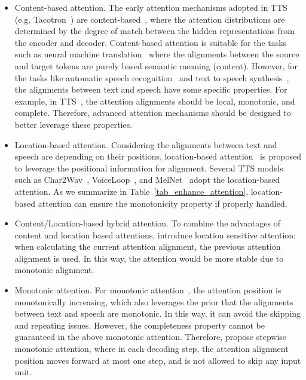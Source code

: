 \documentclass{article}
\begin{document}
\begin{itemize}[leftmargin=*]
    \item Content-based attention. The early attention mechanisms adopted in TTS (e.g. Tacotron~\cite{wang2017tacotron}) are content-based~\cite{bahdanau2014neural}, where the attention distributions are determined by the degree of match between the hidden representations from the encoder and decoder. Content-based attention is suitable for the tasks such as neural machine translation~\cite{bahdanau2014neural,vaswani2017attention} where the alignments between the source and target tokens are purely based semantic meaning (content). However, for the tasks like automatic speech recognition~\cite{chorowski2015attention,chan2016listen,chiu2018state} and text to speech synthesis~\cite{wang2017tacotron}, the alignments between text and speech have some specific properties. For example, in TTS~\cite{he2019robust}, the attention alignments should be local, monotonic, and complete. Therefore, advanced attention mechanisms should be designed to better leverage these properties.  
    \item Location-based attention. Considering the alignments between text and speech are depending on their positions, location-based attention~\cite{graves2013generating,battenberg2020location} is proposed to leverage the positional information for alignment. Several TTS models such as Char2Wav~\cite{sotelo2017char2wav}, VoiceLoop~\cite{taigman2018voiceloop}, and MelNet~\cite{vasquez2019melnet} adopt the location-based attention. As we summarize in Table~\ref{tab_enhance_attention}, location-based attention can ensure the monotonicity property if properly handled.  
    \item Content/Location-based hybrid attention. To combine the advantages of content and location based attentions, \citet{chorowski2015attention,shen2018natural} introduce location sensitive attention: when calculating the current attention alignment, the previous attention alignment is used. In this way, the attention would be more stable due to monotonic alignment. 
    \item Monotonic attention. For monotonic attention~\cite{raffel2017online,chiu2018monotonic,he2019robust,yasuda2019initial,tian2020feathertts}, the attention position is monotonically increasing, which also leverages the prior that the alignments between text and speech are monotonic. In this way, it can avoid the skipping and repeating issues. However, the completeness property cannot be guaranteed in the above monotonic attention. Therefore, \citet{he2019robust} propose stepwise monotonic attention, where in each decoding step, the attention alignment position moves forward at most one step, and is not allowed to skip any input unit. 

\end{itemize}
\end{document}
